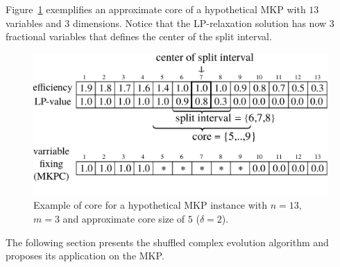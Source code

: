 Figure~\ref{fig:mkpcore} exemplifies an approximate core of a hypothetical MKP
with $13$ variables and $3$ dimensions.
Notice that the LP-relaxation solution has now $3$ fractional variables that
defines the center of the split interval.

\begin{figure}[h]
  \centering
  \includegraphics[scale=0.406]{imgs/mkp_3}
  \caption{Example of core for a hypothetical MKP instance with $n=13$, $m=3$ and approximate core size of $5$ ($\delta = 2$).}
  \label{fig:mkpcore}
\end{figure}

The following section presents the shuffled complex evolution algorithm
and proposes its application on the MKP.
